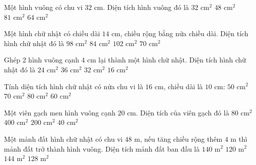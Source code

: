 \begin{ex} %
Một hình vuông có chu vi $32\text{ cm}$. Diện tích hình vuông đó là
\choice
{$32\text{ cm}^2$}
{$48\text{ cm}^2$}
{$81\text{ cm}^2$}
{\True $64\text{ cm}^2$}
\end{ex}

\begin{ex} %
Một hình chữ nhật có chiều dài $14\text{ cm}$, chiều rộng bằng nửa chiều dài. Diện tích hình chữ nhật đó là
\choice
{\True $98\text{ cm}^2$}
{$84\text{ cm}^2$}
{$102\text{ cm}^2$}
{$70\text{ cm}^2$}
\end{ex}

\begin{ex} %
Ghép 2 hình vuông cạnh $4\text{ cm}$ lại thành một hình chữ nhật. Diện tích hình chữ nhật đó là
\choice
{$24\text{ cm}^2$}
{$36\text{ cm}^2$}
{\True $32\text{ cm}^2$}
{$16\text{ cm}^2$}
\end{ex}

\begin{ex} %
Tính diện tích hình chữ nhật có nửa chu vi là $16\text{ cm}$, chiều dài là $10\text{ cm}$:
\choice
{$50\text{ cm}^2$}
{$70\text{ cm}^2$}
{$80\text{ cm}^2$}
{\True $60\text{ cm}^2$}
\end{ex}

\begin{ex} %
Một viên gạch men hình vuông cạnh $20\text{ cm}$. Diện tích của viên gạch đó là
\choice
{$80\text{ cm}^2$}
{\True $400\text{ cm}^2$}
{$200\text{ cm}^2$}
{$40\text{ cm}^2$}
\end{ex}

\begin{ex} %
Một mảnh đất hình chữ nhật có chu vi $48\text{ m}$, nếu tăng chiều rộng thêm $4\text{ m}$ thì mảnh đất trở thành hình vuông. Diện tích mảnh đất ban đầu là
\choice
{\True $140\text{ m}^2$}
{$120\text{ m}^2$}
{$144\text{ m}^2$}
{$128\text{ m}^2$}
\end{ex}

